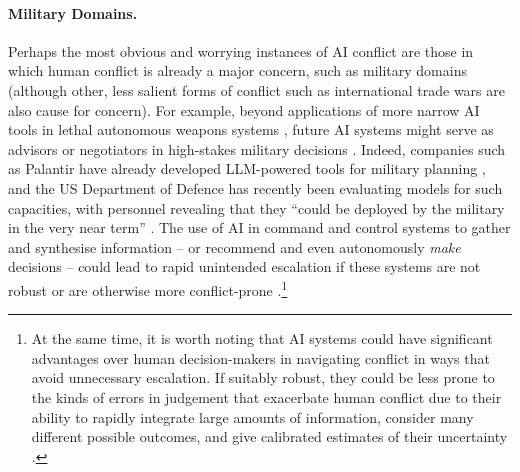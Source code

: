 \paragraph{Military Domains.}
Perhaps the most obvious and worrying instances of AI conflict are those in which human conflict is already a major concern, such as military domains (although other, less salient forms of conflict such as international trade wars are also cause for concern).
For example, beyond applications of more narrow AI tools in lethal autonomous weapons systems \citep{Horowitz2021-bu}, future AI systems might serve as advisors or negotiators in high-stakes military decisions \citep{manson2024ai,Black2024}. 
Indeed, companies such as Palantir have already developed LLM-powered tools for military planning \citep{palantir_aip_defense}, and the US Department of Defence has recently been evaluating models for such capacities, with personnel revealing that they ``could be deployed by the military in the very near term'' \citep{manson2023}.
The use of AI in command and control systems to gather and synthesise information -- or recommend and even autonomously \emph{make} decisions -- could lead to rapid unintended escalation if these systems are not robust or are otherwise more conflict-prone \citep[see also ]{Johnson2020-po,johnson2021artificial,laird2020risks}.\footnote{At the same time, it is worth noting that AI systems could have significant advantages over human decision-makers
in navigating conflict in ways that avoid unnecessary 
escalation. If suitably robust, they could be less prone to the kinds of errors in judgement that exacerbate human conflict due to their ability to rapidly integrate large amounts of information, consider many different possible outcomes, and give calibrated estimates of their uncertainty \citep{Johnson2004-oi,Jervis2017-ng}.} 

